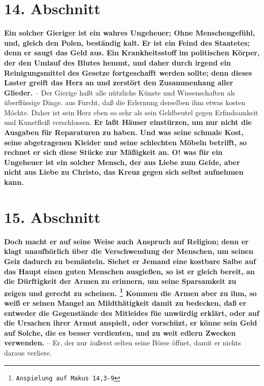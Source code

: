 \section{14. Abschnitt} \label{kap13_ab14}

\textbf{Ein solcher Gieriger ist ein wahres Ungeheuer; Ohne Menschengefühl, und, gleich
den Polen, beständig kalt. Er ist ein Feind des Staatetes; denn er saugt das
Geld aus. Ein Krankheitsstoff im politischen Körper, der den Umlauf des Blutes
hemmt, und daher durch irgend ein Reinigungsmittel des Gesetze fortgeschafft
werden sollte; denn dieses Laster greift das Herz an und zerstört den
Zusammenhang aller Glieder.} -- Der Gierige haßt alle nützliche Künste und
Wissenschaften als überflüssige Dinge. aus Furcht, daß die Erlernung derselben
ihm etwas kosten Möchte. Daher ist sein Herz eben so sehr als sein Geldbeutel
gegen Erfindsamkeit und Kunstfleiß verschlossen. \textbf{Er laßt Häuser einstürzen, um
nur nicht die Ausgaben für Reparaturen zu haben. Und was seine schmale Kost,
seine abgetragenen Kleider und seine schlechten Möbeln betrifft, so rechnet er
sich diese Stücke zur Mäßigkeit an. O! was für ein Ungeheuer ist ein solcher
Mensch, der aus Liebe zum Gelde, aber nicht aus Liebe zu Christo, das Kreuz
gegen sich selbst aufnehmen kann.}

\section{15. Abschnitt} \label{kap13_ab15}

\textbf{Doch macht er auf seine Weise auch Anspruch auf Religion; denn er klagt
unaufhörlich über die Verschwendung der Menschen, um seinen Geiz dadurch zu
bemänteln. Siehet er Jemand eine kostbare Salbe auf das Haupt einen guten
Menschen ausgießen, so ist er gleich bereit, an die Dürftigkeit der Armen zu
erinnern, um seine Sparsamkeit zu zeigen und gerecht zu scheinen.
\footnote{\texttt{Anspielung auf Makus 14,3-9}}
Kommen die
Armen aber zu ihm, so weiß er seinen Mangel an Mildthätigkeit damit zu bedecken,
daß er entweder die Gegenstände des Mitleides füe unwürdig erklärt, oder auf die
Ursachen ihrer Armut anspielt, oder vorschüzt, er könne sein Geld auf Solche,
die es besser verdienten, und zu weit edlern Zwecken verwenden.} -- Er, der nur
äußerst selten seine Börse öffnet, damit er nichts daraus verliere.

